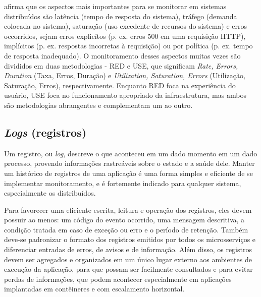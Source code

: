  afirma que os aspectos mais importantes para se monitorar em sistemas distribuídos são latência (tempo de resposta do sistema), tráfego (demanda colocada no sistema), saturação (uso excedente de recursos do sistema) e erros occorridos, sejam erros explicítos (p. ex. erros 500 em uma requisição HTTP), implícitos (p. ex. respostas incorretas à requisição) ou por política (p. ex. tempo de resposta inadequado). O monitoramento desses aspectos muitas vezes são divididos em duas metodologias - RED e USE, que significam \emph{Rate, Errors, Duration} (Taxa, Erros, Duração) e \emph{Utilization, Saturation, Errors} (Utilização, Saturação, Erros), respectivamente. Enquanto RED foca na experiência do usuário, USE foca no funcionamento apropriado da infraestrutura, mas ambos são metodologias abrangentes e complementam um ao outro. \cite{livro-sre-google, grafana-blog}


\subsection{\emph{Logs} (registros)}\label{subsecao-registros}

Um registro, ou \emph{log}, descreve o que aconteceu em um dado momento em um dado processo, provendo informações rastreáveis sobre o estado e a saúde dele. Manter um histórico de registros de uma aplicação é uma forma simples e eficiente de se implementar monitoramento, e é fortemente indicado para qualquer sistema, especialmente os distribuídos. 

Para favorecer uma eficiente escrita, leitura e operação dos registros, eles devem possuir ao menos: um código do evento ocorrido, uma mensagem descritiva, a condição tratada em caso de exceção ou erro e o período de retenção. Também deve-se padronizar o formato dos registros emitidos por todos os microsserviços e diferenciar entradas de erros, de avisos e de informação. Além disso, os registros devem ser agregados e organizados em um único lugar externo aos ambientes de execução da aplicação, para que possam ser facilmente consultados e para evitar perdas de informações, que podem acontecer especialmente em aplicações implantadas em contêineres e com escalamento horizontal. \cite{livro-sre-google-workbook}


